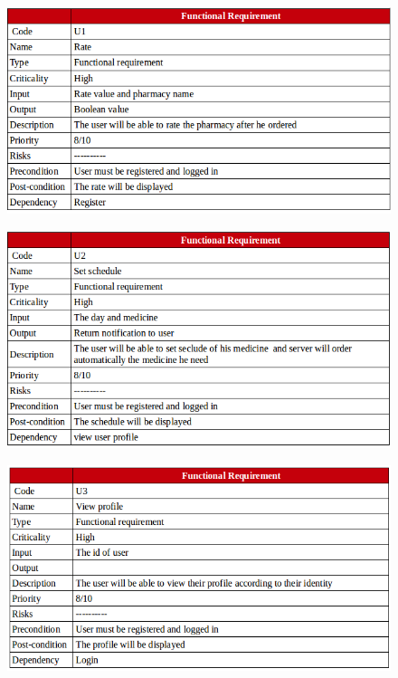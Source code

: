 \documentclass[]{article}
\begin{document}
\begin{figure}[H]
\centering
\includegraphics[scale=0.4]{./f/15}
\end{figure}

\begin{figure}[H]
\centering
\includegraphics[scale=0.4]{./f/16}
\end{figure}

\begin{figure}[H]
\centering
\includegraphics[scale=0.4]{./f/17}
\end{figure}
\end{document}
